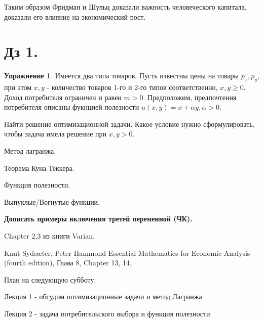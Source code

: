 \documentclass[reqno]{article}
\theoremstyle{definition}
\theoremstyle{definition}
\theoremstyle{definition}
\theoremstyle{definition}
\theoremstyle{definition}
\newtheorem{exc}{Упражнение}[section]
\theoremstyle{definition}
\theoremstyle{definition}
\theoremstyle{definition}
\theoremstyle{definition}
\begin{document}
	Таким образом Фридман и Шульц доказали важность человеческого капитала, доказали его влияние на экономический рост.
	
	\section*{Дз 1.}
	\begin{exc}
		Имеется два типа товаров. Пусть известны цены на товары $p_x, p_y$, при этом $x, y$ - количество товаров 1-го и 2-го типов соответственно, $x,y \geq 0$. Доход потребителя ограничен и равен $m > 0$. Предположим, предпочтения потребителя описаны фукнцией полезности $u(x,y) = x + \alpha y, \alpha > 0.$
		
		Найти решение оптимизационной задачи. Какое условие нужно сформулировать, чтобы задача имела решение при $x,y > 0$.
	\end{exc}
	
	Метод лагранжа.
	
	Теорема Куна-Теккера.
	
	Функция полезности.
	
	Выпуклые/Вогнутые функции.
	
	\textbf{Дописать примеры включения третей переменной (ЧК).}
	
	Chapter 2,3 из книги Varian.
	
	Knut Sydsæter, Peter Hammond Essential Mathematics for Economic Analysis (fourth edition), Глава 8, Chapter 13, 14.
	
	План на следующую субботу: 
	
	Лекция 1 - обсудим оптимизационные задачи и метод Лагранжа
	
	Лекция 2 - задача потребительского выбора и функция полезности
	
	\newpage
	\section{}
\end{document}
